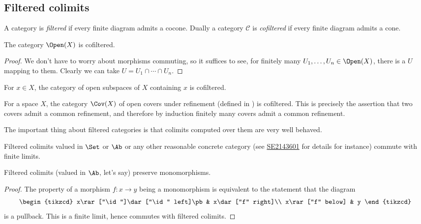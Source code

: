 \documentclass[11pt]{book}
\begin{document}
\subsection{Filtered colimits}

\begin{definition} A category is \emph{filtered} if every finite diagram admits a cocone. Dually a category $\mathscr{C}$ is \emph{cofiltered} if every finite diagram admits a cone.
\end{definition}

\begin{example}\label{exa:OpenX-filtered} The category $\Open(X)$ is cofiltered.
\end{example}
\begin{proof} We don't have to worry about morphisms commuting, so it suffices to see, for finitely many $U_1, \ldots, U_n\in \Open(X)$, there is a $U$ mapping to them. Clearly we can take $U = U_1\cap \cdots \cap U_n$.
\end{proof}
\begin{example}\label{exa:OpenX-containing-x-filtered} For $x\in X$, the category of open subspaces of $X$ containing $x$ is cofiltered.
\end{example}


\begin{example}\label{exa:CovX-filtered} For a space $X$, the category $\Cov(X)$ of open covers under refinement (defined in ) is cofiltered. This is precisely the assertion that two covers admit a common refinement, and therefore by induction finitely many covers admit a common refinement.
\end{example}

The important thing about filtered categories is that colimits computed over them are very well behaved.

\begin{proposition} Filtered colimits valued in $\Set$ or $\Ab$ or any other reasonable concrete category (see \href{https://math.stackexchange.com/a/2143601}{SE2143601} for details for instance) commute with finite limits.
\end{proposition}

\begin{corollary} Filtered colimits (valued in $\Ab$, let's say) preserve monomorphisms.
\end{corollary}
\begin{proof} The property of a morphism $f \colon x \to y$ being a monomorphism is equivalent to the statement that the diagram
\[ \begin{tikzcd}
    x\rar["\id"]\dar["\id" left]\pb & x\dar["f" right]\\
    x\rar["f" below] & y
\end{tikzcd} \]
is a pullback. This is a finite limit, hence commutes with filtered colimits.
\end{proof}
\end{document}
